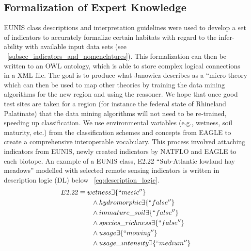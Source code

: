 \documentclass[authoryear, review,12pt,number]{elsarticle}
\begin{document}
\subsection{Formalization of Expert Knowledge}
EUNIS class descriptions and interpretation guidelines \citep{EUNISManual} were
used to develop a set of indicators to accurately formalize certain habitats
with regard to the infer-ability with available input data sets (see
~\ref{subsec_indicators_and_nomenclatures}). This formalization can then be
written to an OWL ontology, which is able to store complex logical connections
in a XML file. The goal is to produce what Janowicz describes
as a ``micro theory \citep{Janowicz2012} which can then be used to map other
theories by training the data mining algorithms for the new
region and using the reasoner. We hope that once good test sites are taken for 
a region (for instance the federal state of Rhineland Palatinate) that the data 
mining algorithms will not need to be re-trained, speeding up classification. 
We use environmental variables (e.g., wetness, soil maturity, etc.) from the 
classification schemes and concepts from EAGLE to create a comprehensive 
interoperable vocabulary. This process involved attaching indicators from 
EUNIS, newly created indicators by NATFLO and EAGLE
to each biotope. An example of a EUNIS class, E2.22
``Sub-Atlantic lowland hay meadows'' modelled with selected remote sensing
indicators is written in description logic (DL) below
~\ref{eq:description_logic}.
\begin{equation}
\begin{align*}
E2.22 &\equiv wetness \exists \{``mesic''\} \\
&\qquad {} \land hydromorphic \exists \{``false''\} \\
&\qquad {} \land immature\_soil \exists \{``false''\} \\
&\qquad {} \land species\_richness \exists \{``false''\} \\
&\qquad {} \land usage \exists \{``mowing''\} \\
&\qquad {} \land usage\_intensity \exists \{``medium''\} \\
\end{align*}
\label{eq:description_logic}
\end{equation}
\end{document}
